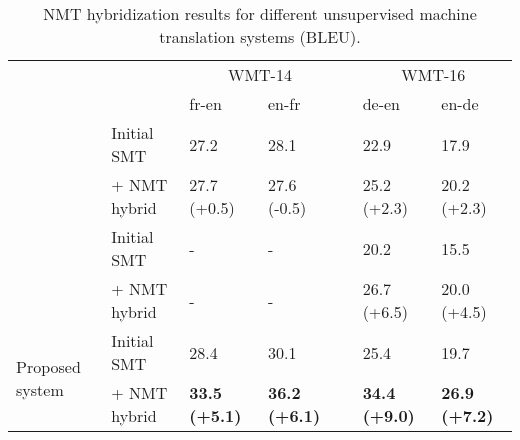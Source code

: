 \documentclass[11pt,a4paper]{article}
\begin{document}
\begin{table*}[t]
\begin{center}
\begin{small}
  \begin{tabular}{llllcll}
    \toprule
    & & \multicolumn{2}{c}{WMT-14} & & \multicolumn{2}{c}{WMT-16} \\
    \cmidrule{3-4} \cmidrule{6-7}
    & & \multicolumn{1}{l}{fr-en} & \multicolumn{1}{l}{en-fr} & & \multicolumn{1}{l}{de-en} & \multicolumn{1}{l}{en-de} \\
    \midrule
    \multirow{2}{*}{\citet{lample2018phrase}}
    & Initial SMT & 27.2 & 28.1 & & 22.9 & 17.9 \\
    & + NMT hybrid & 27.7 \scriptsize{(+0.5)} & 27.6 \scriptsize{(-0.5)} & & 25.2 \scriptsize{(+2.3)} & 20.2 \scriptsize{(+2.3)} \\
    \midrule
    \multirow{2}{*}{\citet{marie2018unsupervised}}
    & Initial SMT & - & - & & 20.2 & 15.5 \\
    & + NMT hybrid & - & - & & 26.7 \scriptsize{(+6.5)} & 20.0 \scriptsize{(+4.5)} \\
    \midrule
    \multirow{2}{*}{Proposed system}
    & Initial SMT & 28.4 & 30.1 & & 25.4 & 19.7 \\
    & + NMT hybrid & \bf 33.5 \scriptsize{(+5.1)} & \bf 36.2 \scriptsize{(+6.1)} & & \bf 34.4 \scriptsize{(+9.0)} & \bf 26.9 \scriptsize{(+7.2)} \\
    \bottomrule
  \end{tabular}
\end{small}
\end{center}
\caption{NMT hybridization results for different unsupervised machine translation systems (BLEU).}
\label{tab:results_hybrid}
\end{table*}
\end{document}
